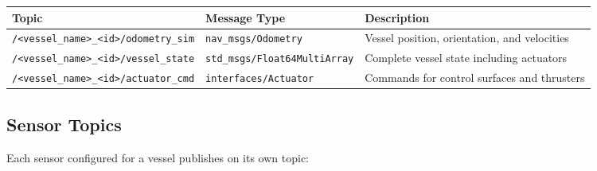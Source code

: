 \documentclass[
  letterpaper,
  DIV=11,
  numbers=noendperiod]{scrreprt}
\begin{document}
\begin{longtable}[]{@{}
  >{\raggedright\arraybackslash}p{}
  >{\raggedright\arraybackslash}p{}
  >{\raggedright\arraybackslash}p{}@{}}
\toprule\noalign{}
\begin{minipage}[b]{\linewidth}\raggedright
Topic
\end{minipage} & \begin{minipage}[b]{\linewidth}\raggedright
Message Type
\end{minipage} & \begin{minipage}[b]{\linewidth}\raggedright
Description
\end{minipage} \\
\midrule\noalign{}
\endhead
\bottomrule\noalign{}
\endlastfoot
\texttt{/\textless{}vessel\_name\textgreater{}\_\textless{}id\textgreater{}/odometry\_sim}
& \texttt{nav\_msgs/Odometry} & Vessel position, orientation, and
velocities \\
\texttt{/\textless{}vessel\_name\textgreater{}\_\textless{}id\textgreater{}/vessel\_state}
& \texttt{std\_msgs/Float64MultiArray} & Complete vessel state including
actuators \\
\texttt{/\textless{}vessel\_name\textgreater{}\_\textless{}id\textgreater{}/actuator\_cmd}
& \texttt{interfaces/Actuator} & Commands for control surfaces and
thrusters \\
\end{longtable}

\subsection*{Sensor Topics}\label{sensor-topics}

Each sensor configured for a vessel publishes on its own topic:
\end{document}
